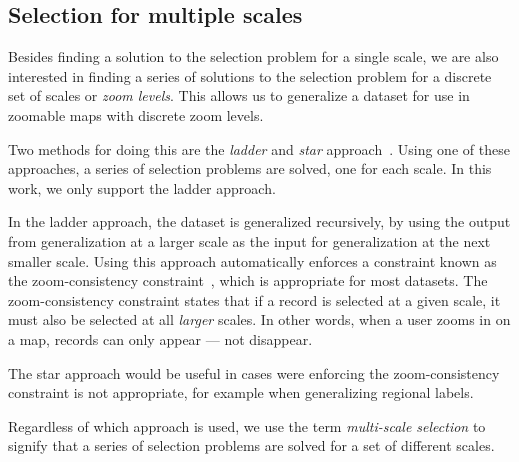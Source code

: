\subsection{Selection for multiple scales}

Besides finding a solution to the selection problem for a single scale, we are also interested in finding a series of solutions to the selection problem for a discrete set of scales or \emph{zoom levels}. This allows us to generalize a dataset for use in zoomable maps with discrete zoom levels.

Two methods for doing this are the \emph{ladder} and \emph{star} approach~\cite{foerster2010challenges}. Using one of these approaches, a series of selection problems are solved, one for each scale. In this work, we only support the ladder approach.

In the ladder approach, the dataset is generalized recursively, by using the output from generalization at a larger scale as the input for generalization at the next smaller scale. Using this approach automatically enforces a constraint known as the zoom-consistency constraint~\cite{sarma2012fusiontables}, which is appropriate for most datasets. The zoom-consistency constraint states that if a record is selected at a given scale, it must also be selected at all \emph{larger} scales. In other words, when a user zooms in on a map, records can only appear --- not disappear.

The star approach would be useful in cases were enforcing the zoom-consistency constraint is not appropriate, for example when generalizing regional labels.

Regardless of which approach is used, we use the term \emph{multi-scale selection} to signify that a series of selection problems are solved for a set of different scales.
